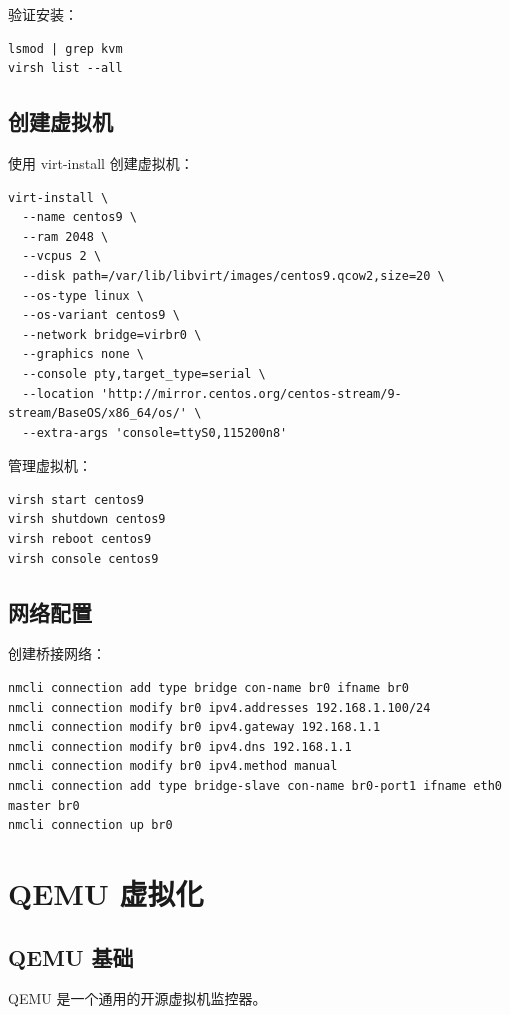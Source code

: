 \documentclass[12pt,UTF8]{ctexbook}
\begin{document}
验证安装：
\begin{verbatim}
lsmod | grep kvm
virsh list --all
\end{verbatim}

\section{创建虚拟机}
\label{sec:create_vm}

使用 virt-install 创建虚拟机：

\begin{verbatim}
virt-install \
  --name centos9 \
  --ram 2048 \
  --vcpus 2 \
  --disk path=/var/lib/libvirt/images/centos9.qcow2,size=20 \
  --os-type linux \
  --os-variant centos9 \
  --network bridge=virbr0 \
  --graphics none \
  --console pty,target_type=serial \
  --location 'http://mirror.centos.org/centos-stream/9-stream/BaseOS/x86_64/os/' \
  --extra-args 'console=ttyS0,115200n8'
\end{verbatim}

管理虚拟机：
\begin{verbatim}
virsh start centos9
virsh shutdown centos9
virsh reboot centos9
virsh console centos9
\end{verbatim}

\section{网络配置}
\label{sec:network_config}

创建桥接网络：
\begin{verbatim}
nmcli connection add type bridge con-name br0 ifname br0
nmcli connection modify br0 ipv4.addresses 192.168.1.100/24
nmcli connection modify br0 ipv4.gateway 192.168.1.1
nmcli connection modify br0 ipv4.dns 192.168.1.1
nmcli connection modify br0 ipv4.method manual
nmcli connection add type bridge-slave con-name br0-port1 ifname eth0 master br0
nmcli connection up br0
\end{verbatim}

\chapter{QEMU 虚拟化}
\label{chap:qemu}

\section{QEMU 基础}
\label{sec:qemu_basics}

QEMU 是一个通用的开源虚拟机监控器。
\end{document}
